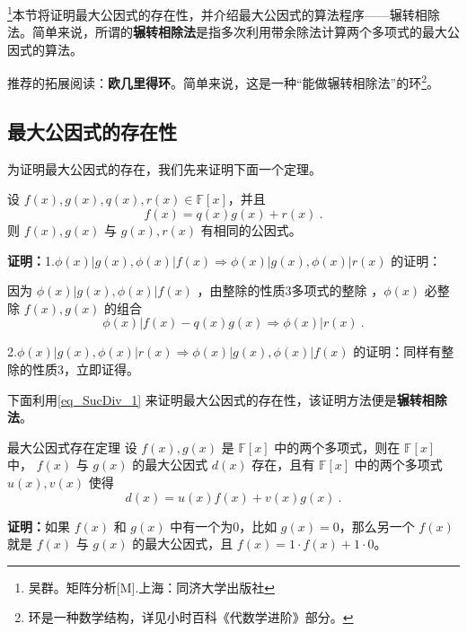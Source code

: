 
\begin{issues}
\end{issues}
\footnote{吴群。矩阵分析[M].上海：同济大学出版社}本节将证明最大公因式的存在性，并介绍最大公因式的算法程序——辗转相除法。简单来说，所谓的\textbf{辗转相除法}是指多次利用带余除法计算两个多项式的最大公因式的算法。


推荐的拓展阅读：\textbf{欧几里得环}。简单来说，这是一种“能做辗转相除法”的环\footnote{环是一种数学结构，详见小时百科《代数学进阶》部分。}。


\subsection{最大公因式的存在性}
为证明最大公因式的存在，我们先来证明下面一个定理。
\begin{theorem}{}\label{the_SucDiv_1}
设 $f(x),g(x),q(x),r(x)\in\mathbb{F}[x]$，并且
\begin{equation}\label{eq_SucDiv_1}
f(x)=q(x)g(x)+r(x)~.
\end{equation}
则 $f(x),g(x)$ 与 $g(x),r(x)$ 有相同的公因式。
\end{theorem}
\textbf{证明：}1.$\phi(x)|g(x),\phi(x)|f(x)\Rightarrow \phi(x)|g(x),\phi(x)|r(x)$ 的证明：

因为 $\phi(x)|g(x),\phi(x)|f(x)$ ，由整除的性质3多项式的整除 ，$\phi(x)$ 必整除 $f(x),g(x)$ 的组合
\begin{equation}
\phi(x)|f(x)-q(x)g(x)\Rightarrow \phi(x)|r(x)~.
\end{equation}

2.$\phi(x)|g(x),\phi(x)|r(x)\Rightarrow\phi(x)|g(x),\phi(x)|f(x)$ 的证明：同样有整除的性质3，立即证得。

下面利用\autoref{eq_SucDiv_1} 来证明最大公因式的存在性，该证明方法便是\textbf{辗转相除法}。
\begin{theorem}{最大公因式存在定理}\label{the_SucDiv_2}
设 $f(x),g(x)$ 是 $\mathbb{F}[x]$ 中的两个多项式，则在 $\mathbb{F}[x]$ 中， $f(x)$ 与 $g(x)$ 的最大公因式 $d(x)$ 存在，且有 $\mathbb{F}[x]$ 中的两个多项式 $u(x),v(x)$ 使得
\begin{equation}\label{eq_SucDiv_2}
d(x)=u(x)f(x)+v(x)g(x)~.
\end{equation}

\end{theorem}
\textbf{证明：}如果 $f(x)$ 和 $g(x)$ 中有一个为0，比如 $g(x)=0$，那么另一个 $f(x)$ 就是 $f(x)$ 与 $g(x)$ 的最大公因式，且 $f(x)=1\cdot f(x)+1\cdot0$。

